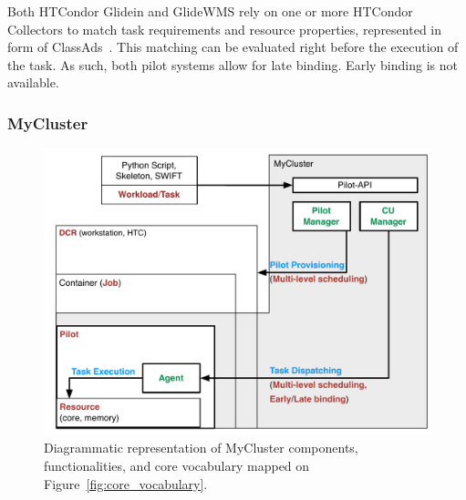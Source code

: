 \documentclass{sig-alternate}
\begin{document}

Both HTCondor Glidein and GlideWMS rely on one or more HTCondor Collectors to
match task requirements and resource properties, represented in form of
ClassAds~\cite{classad_url}. This matching can be evaluated right before the
execution of the task. As such, both pilot systems allow for late binding. Early
binding is not available.


%
\subsubsection{MyCluster}\label{sec:mycluster}




\begin{figure}[t]
    \centering
        \includegraphics[width=.48\textwidth]{figures/mycluster_comparison.pdf}
    \caption{Diagrammatic representation of MyCluster components,
    functionalities, and core vocabulary mapped on
    Figure~\ref{fig:core_vocabulary}.}
    \label{fig:mycluster_comparison}
\end{figure}
\end{document}
